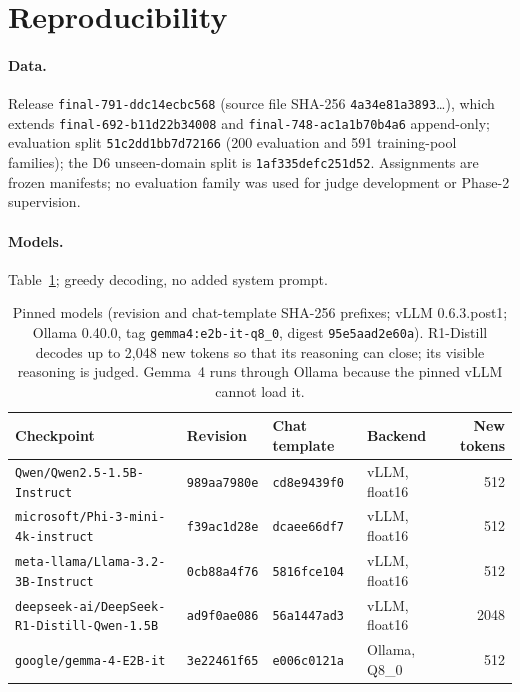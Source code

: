 \section{Reproducibility}
\label{app:repro}
\paragraph{Data.} Release \texttt{final-791-ddc14ecbc568} (source file SHA-256 \texttt{4a34e81a3893}\ldots), which extends \texttt{final-692-b11d22b34008} and \texttt{final-748-ac1a1b70b4a6} append-only; evaluation split \texttt{51c2dd1bb7d72166} (200 evaluation and 591 training-pool families); the D6 unseen-domain split is \texttt{1af335defc251d52}. Assignments are frozen manifests; no evaluation family was used for judge development or Phase-2 supervision.

\paragraph{Models.} Table~\ref{tab:app-models}; greedy decoding, no added system prompt.

\begin{table}[t]
\centering\footnotesize\setlength{\tabcolsep}{4pt}
\begin{tabular}{@{}llllr@{}}
\toprule
Checkpoint & Revision & Chat template & Backend & New tokens \\
\midrule
{\scriptsize\texttt{Qwen/Qwen2.5-1.5B-Instruct}} & \texttt{989aa7980e} & \texttt{cd8e9439f0} & vLLM, float16 & 512 \\
{\scriptsize\texttt{microsoft/Phi-3-mini-4k-instruct}} & \texttt{f39ac1d28e} & \texttt{dcaee66df7} & vLLM, float16 & 512 \\
{\scriptsize\texttt{meta-llama/Llama-3.2-3B-Instruct}} & \texttt{0cb88a4f76} & \texttt{5816fce104} & vLLM, float16 & 512 \\
{\scriptsize\texttt{deepseek-ai/DeepSeek-R1-Distill-Qwen-1.5B}} & \texttt{ad9f0ae086} & \texttt{56a1447ad3} & vLLM, float16 & 2048 \\
{\scriptsize\texttt{google/gemma-4-E2B-it}} & \texttt{3e22461f65} & \texttt{e006c0121a} & Ollama, Q8\_0 & 512 \\
\bottomrule
\end{tabular}
\caption{Pinned models (revision and chat-template SHA-256 prefixes; vLLM 0.6.3.post1; Ollama 0.40.0, tag \texttt{gemma4:e2b-it-q8\_0}, digest \texttt{95e5aad2e60a}). R1-Distill decodes up to 2{,}048 new tokens so that its reasoning can close; its visible reasoning is judged. Gemma~4 runs through Ollama because the pinned vLLM cannot load it.}
\label{tab:app-models}
\end{table}

